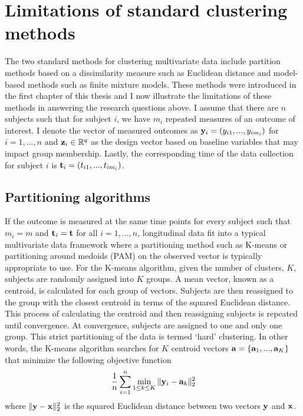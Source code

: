 \section{Limitations of standard clustering methods}
The two standard methods for clustering multivariate data include partition methods based on a dissimilarity measure such as Euclidean distance and model-based methods such as finite mixture models. These methods were introduced in the first chapter of this thesis and I now illustrate the limitations of these methods in answering the research questions above. I assume that there are $n$ subjects such that for subject $i$, we have $m_{i}$ repeated measures of an outcome of interest. I denote the vector of measured outcomes as $\mathbf y_{i}=(y_{i1},...,y_{im_{i}})$ for $i=1,...,n$ and $\mathbf z_{i}\in \mathbb{R}^{q}$ as the design vector based on baseline variables that may impact group membership. Lastly, the corresponding time of the data collection for subject $i$ is $\mathbf t_{i}=(t_{i1},...,t_{im_{i}})$. 
\subsection{Partitioning algorithms}
If the outcome is measured at the same time points for every subject such that $m_{i}=m$ and $\mathbf t_{i}=\mathbf t$ for all $i=1,...,n$, longitudinal data fit into a typical multivariate data framework where a partitioning method such as K-means \cite{macqueen1967, hartigan1979} or partitioning around medoids (PAM) \cite{kaufman1990} on the observed vector is typically appropriate to use. For the K-means algorithm, given the number of clusters, $K$, subjects are randomly assigned into $K$ groups. A mean vector, known as a centroid, is calculated for each group of vectors. Subjects are then reassigned to the group with the closest centroid in terms of the squared Euclidean distance. This process of calculating the centroid and then reassigning subjects is repeated until convergence. At convergence, subjects are assigned to one and only one group. This strict partitioning of the data is termed `hard' clustering. In other words, the K-means algorithm searches for $K$ centroid vectors $\mathbf a=\{\mathbf a_{1}, ...,\mathbf a_{K}\}$ that minimize the following objective function
$$\frac{1}{n} \sum^{n}_{i=1}\min_{1\leq k\leq K}\|\mathbf  y_{i}-\mathbf a_{k}\|_{2}^{2}$$
where $\|\mathbf y - \mathbf x\|^{2}_{2}$ is the squared Euclidean distance between two vectors $\mathbf y$ and $\mathbf x$.

